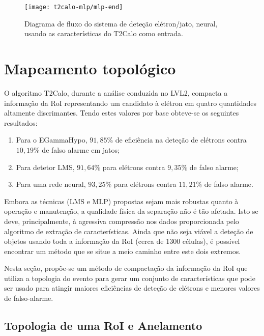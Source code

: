 \begin{figure}
\begin{center}
\begin{sideways}
\texttt{[image: t2calo-mlp/mlp-end]}
\end{sideways}
\end{center}
\caption{Diagrama de fluxo do sistema de deteção elétron/jato, neural, usando as
características do T2Calo como entrada.}
\label{fig:t2calo-mlp-best-net}
\end{figure}

\section{Mapeamento topológico}

O algoritmo T2Calo, durante a análise conduzida no LVL2, compacta a informação
da RoI representando um candidato à elétron em quatro quantidades altamente
discrimantes. Tendo estes valores por base obteve-se os seguintes resultados:

\begin{enumerate}
\item Para o EGammaHypo, $91,85\%$ de eficiência na deteção de elétrons contra
$10,19\%$ de falso alarme em jatos;
\item Para detetor LMS, $91,64\%$ para elétrons contra $9,35\%$ de falso alarme;
\item Para uma rede neural, $93,25\%$ para elétrons contra $11,21\%$ de falso
alarme.
\end{enumerate}

Embora as técnicas (LMS e MLP) propostas sejam mais robustas quanto à operação
e manutenção, a qualidade física da separação não é tão afetada. Isto se deve,
principalmente, à agressiva compressão nos dados proporcionada pelo algoritmo
de extração de características. Ainda que não seja viável a deteção de objetos
usando toda a informação da RoI (cerca de 1300 células), é possível encontrar
um método que se situe a meio caminho entre este dois extremos.

Nesta seção, propõe-se um método de compactação da informação da RoI que
utiliza a topologia do evento para gerar um conjunto de características que
pode ser usado para atingir maiores eficiências de deteção de elétrons e
menores valores de falso-alarme.

\subsection{Topologia de uma RoI e Anelamento}

